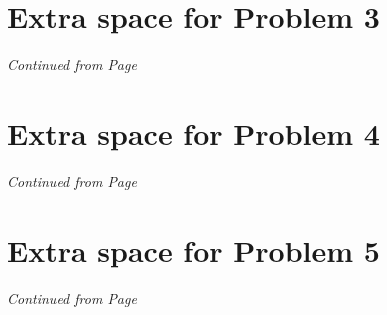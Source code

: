 \documentclass[11pt]{article}
\begin{document}
 
\label{pg:p2-continuation}
\newpage
 
\section*{Extra space for Problem 3}
\emph{Continued from Page \pageref{pg:end-of-p3}}
 
\label{pg:p3-continuation}

\newpage

\section*{Extra space for Problem 4}
\emph{Continued from Page \pageref{pg:end-of-p4}}

\newpage

\section*{Extra space for Problem 5}
\emph{Continued from Page \pageref{pg:end-of-p5}}
\end{document}
